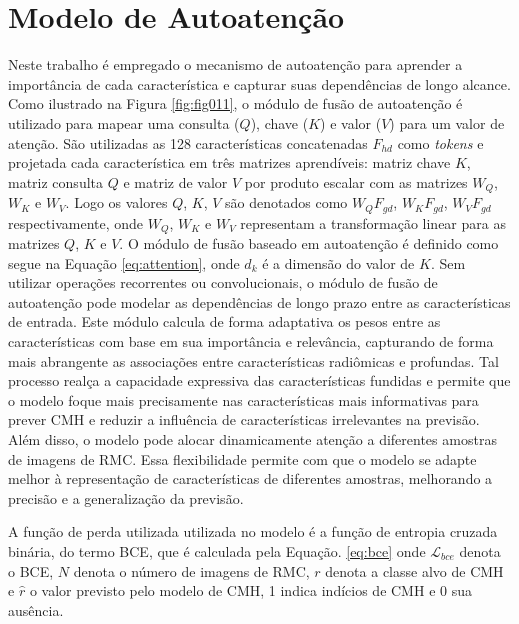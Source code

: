\section{Modelo de Autoatenção}
\label{subsec:cap4_mod_self_attention}

Neste trabalho é empregado o mecanismo de autoatenção para aprender a importância de cada característica e capturar suas dependências de longo alcance. Como ilustrado na Figura \ref{fig:fig011}, o módulo de fusão de autoatenção é utilizado para mapear uma consulta ($Q$), chave ($K$) e valor ($V$) para um valor de atenção. São utilizadas as 128 características concatenadas $F_{hd}$ como \textit{tokens} e projetada cada característica em três matrizes aprendíveis: matriz chave $K$, matriz consulta $Q$ e matriz de valor $V$ por produto escalar com as matrizes $W_{Q}$, $W_{K}$ e $W_{V}$. Logo os valores $Q$, $K$, $V$ são denotados como $W_{Q}F_{gd}$, $W_{K}F_{gd}$, $W_{V}F_{gd}$ respectivamente, onde $W_{Q}$, $W_{K}$ e $W_{V}$ representam a transformação linear para as matrizes $Q$, $K$ e $V$. O módulo de fusão baseado em autoatenção é definido como segue na Equação \ref{eq:attention}, onde $d_{k}$ é a dimensão do valor de $K$. Sem utilizar operações recorrentes ou convolucionais, o módulo de fusão de autoatenção pode modelar as dependências de longo prazo entre as características de entrada.
Este módulo calcula de forma adaptativa os pesos entre as características com base em sua importância e relevância, capturando de forma mais abrangente as associações entre características radiômicas e profundas. Tal processo realça a capacidade expressiva das características fundidas e permite que o modelo foque mais precisamente nas características mais informativas para prever \gls{CMH} e reduzir a influência de características irrelevantes na previsão. Além disso, o modelo pode alocar dinamicamente atenção a diferentes amostras de imagens de \gls{RMC}. Essa flexibilidade permite com que o modelo se adapte melhor à representação de características de diferentes amostras, melhorando a precisão e a generalização da previsão.

A função de perda utilizada utilizada no modelo é a função de entropia cruzada binária, do termo  \gls{BCE}, que é calculada pela Equação. \ref{eq:bce} onde $\mathcal{L}_{bce}$ denota o \gls{BCE}, $N$ denota o número de imagens de \gls{RMC}, $r$ denota a classe alvo de \gls{CMH} e $\hat{r}$ o valor previsto pelo modelo de \gls{CMH}, 1 indica indícios de \gls{CMH} e 0 sua ausência.

